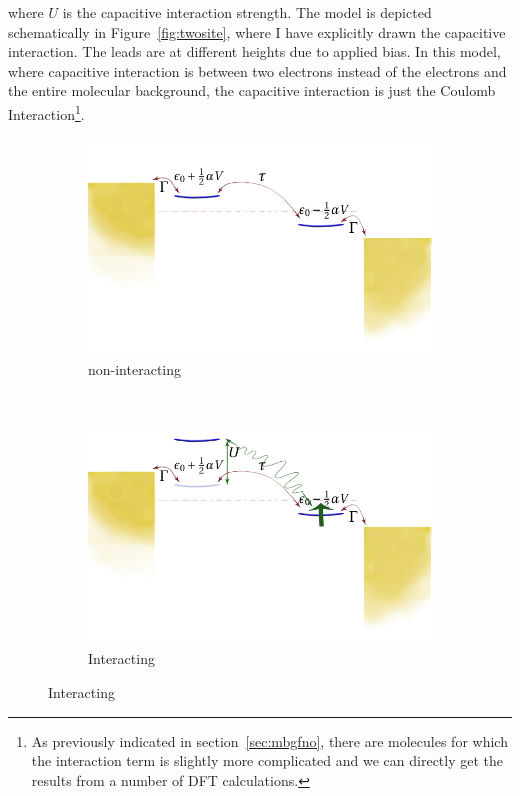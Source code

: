 where $U$ is the capacitive interaction strength.  The model is depicted schematically in Figure~\ref{fig:twosite}, where I have explicitly drawn the capacitive interaction. The leads are at different heights due to applied bias. In this model, where capacitive interaction is between two electrons instead of the electrons and the entire molecular background, the capacitive interaction is just the Coulomb Interaction\footnote{As previously indicated in section~\ref{sec:mbgfno}, there are molecules for which the interaction term is slightly more complicated and we can directly get the results from a number of DFT calculations.}.


\begin{figure}[h]
    \begin{subfigure}[b]{0.48\textwidth}
        \includegraphics[height=.20\textheight]{pdf/non_interacting_schematics.pdf}\caption{non\hyp{}interacting}\label{fig:twositea}
    \end{subfigure}
    ~
    \begin{subfigure}[!tb]{0.48\textwidth}
        \includegraphics[height=.20\textheight]{pdf/interacting_schematics.pdf}\caption{Interacting}\label{fig:twositeb}

\end{subfigure}
\end{figure}
